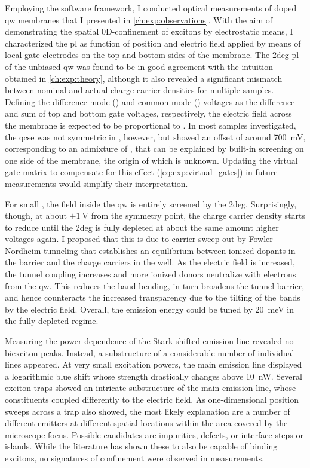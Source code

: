 Employing the \mjolnir software framework, I conducted optical measurements of doped \gls{qw} membranes that I presented in \cref{ch:exp:observations}.
With the aim of demonstrating the spatial 0D-confinement of excitons by electrostatic means, I characterized the \gls{pl} as function of position and electric field applied by means of local gate electrodes on the top and bottom sides of the membrane.
The \gls{2deg} \gls{pl} of the unbiased \gls{qw} was found to be in good agreement with the intuition obtained in \cref{ch:exp:theory}, although it also revealed a significant mismatch between nominal and actual charge carrier densities for multiple samples.
Defining the difference-mode (\VDM) and common-mode (\VCM) voltages as the difference and sum of top and bottom gate voltages, respectively, the electric field across the membrane is expected to be proportional to \VDM.
In most samples investigated, the \gls{qcse} was not symmetric in \VDM, however, but showed an offset of around \qty{700}{\milli\volt}, corresponding to an admixture of \VCM, that can be explained by built-in screening on one side of the membrane, the origin of which is unknown.
Updating the virtual gate matrix to compensate for this effect (\cref{eq:exp:virtual_gates}) in future measurements would simplify their interpretation.

For small \VDM, the field inside the \gls{qw} is entirely screened by the \gls{2deg}.
Surprisingly, though, at about $\pm\qty{1}{\volt}$ from the symmetry point, the charge carrier density starts to reduce until the \gls{2deg} is fully depleted at about the same amount higher voltages again.
I proposed that this is due to carrier sweep-out by Fowler-Nordheim tunneling that establishes an equilibrium between ionized dopants in the  barrier and the charge carriers in the well.
As the electric field is increased, the tunnel coupling increases and more ionized donors neutralize with electrons from the \gls{qw}.
This reduces the band bending, in turn broadens the tunnel barrier, and hence counteracts the increased transparency due to the tilting of the bands by the electric field.
Overall, the emission energy could be tuned by \qty{20}{\milli\electronvolt} in the fully depleted regime.

Measuring the power dependence of the Stark-shifted emission line revealed no biexciton peaks.
Instead, a substructure of a considerable number of individual lines appeared.
At very small excitation powers, the main emission line displayed a logarithmic blue shift whose strength drastically changes above \qty{10}{\nano\watt}.
Several exciton traps showed an intricate substructure of the main emission line, whose constituents coupled differently to the electric field.
As one-dimensional position sweeps across a trap also showed, the most likely explanation are a number of different emitters at different spatial locations within the area covered by the microscope focus.
Possible candidates are impurities, defects, or interface steps or islands.
While the literature has shown these to also be capable of binding excitons, no signatures of confinement were observed in  measurements.

